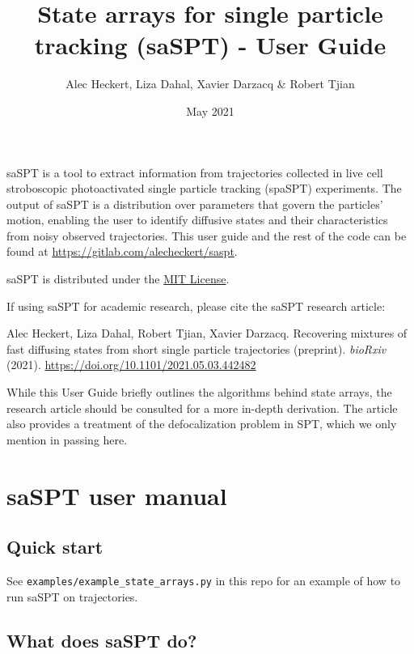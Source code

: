 \documentclass{article}
\begin{document}
\title{State arrays for single particle tracking (saSPT) - User Guide} 
\author{Alec Heckert, Liza Dahal, Xavier Darzacq \& Robert Tjian}

\date{May 2021}

\maketitle

saSPT is a tool to extract information from trajectories collected in 
live cell stroboscopic photoactivated single particle tracking (spaSPT)
experiments. The output of saSPT is a distribution over
parameters that govern the particles' motion, enabling the user to identify
diffusive states and their characteristics from noisy observed trajectories.
This user guide and the rest of the code can be found at
\url{https://gitlab.com/alecheckert/saspt}.

saSPT is distributed under the \href{https://gitlab.com/alecheckert/saspt/-/blob/main/LICENSE}{MIT License}.

If using saSPT for academic research, please cite the saSPT research 
article:

Alec Heckert, Liza Dahal, Robert Tjian, Xavier Darzacq. Recovering mixtures of fast diffusing states from short single particle trajectories (preprint). \emph{bioRxiv} (2021). \url{https://doi.org/10.1101/2021.05.03.442482}

While this User Guide briefly outlines the algorithms behind state arrays, the 
research article should be consulted for a more in-depth derivation. The article
also provides a treatment of the defocalization problem in SPT, which we only 
mention in passing here. 

\newpage

\tableofcontents

\section{saSPT user manual}

\subsection{Quick start}

See \verb|examples/example_state_arrays.py| in this repo for an
example of how to run saSPT on trajectories.

\subsection{What does saSPT do?}
\end{document}
